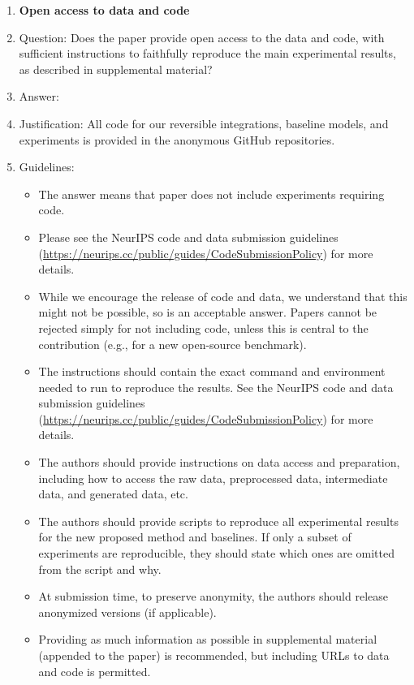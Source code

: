 \begin{enumerate}
\item {\bf Open access to data and code}
    \item[] Question: Does the paper provide open access to the data and code, with sufficient instructions to faithfully reproduce the main experimental results, as described in supplemental material?
    \item[] Answer: \answerYes{} %
    \item[] Justification: All code for our reversible integrations, baseline models, and experiments is provided in the anonymous GitHub repositories.
    \item[] Guidelines:
    \begin{itemize}
        \item The answer \answerNA{} means that paper does not include experiments requiring code.
        \item Please see the NeurIPS code and data submission guidelines (\url{https://neurips.cc/public/guides/CodeSubmissionPolicy}) for more details.
        \item While we encourage the release of code and data, we understand that this might not be possible, so \answerNo{} is an acceptable answer. Papers cannot be rejected simply for not including code, unless this is central to the contribution (e.g., for a new open-source benchmark).
        \item The instructions should contain the exact command and environment needed to run to reproduce the results. See the NeurIPS code and data submission guidelines (\url{https://neurips.cc/public/guides/CodeSubmissionPolicy}) for more details.
        \item The authors should provide instructions on data access and preparation, including how to access the raw data, preprocessed data, intermediate data, and generated data, etc.
        \item The authors should provide scripts to reproduce all experimental results for the new proposed method and baselines. If only a subset of experiments are reproducible, they should state which ones are omitted from the script and why.
        \item At submission time, to preserve anonymity, the authors should release anonymized versions (if applicable).
        \item Providing as much information as possible in supplemental material (appended to the paper) is recommended, but including URLs to data and code is permitted.
    \end{itemize}



\end{enumerate}
